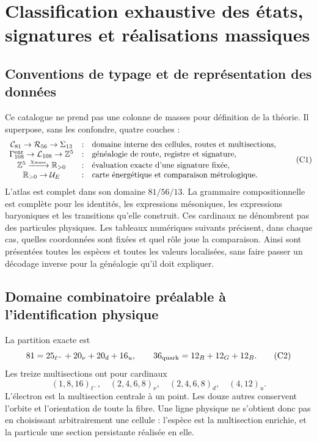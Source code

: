 \chapter{Classification exhaustive des états, signatures et réalisations massiques}
\label{app:catalogo-cientifico-masas-rev6}

\section{Conventions de typage et de représentation des données}

Ce catalogue ne prend pas une colonne de masses pour définition de la théorie.
Il superpose, sans les confondre, quatre couches :
\[
\begin{array}{ccl}
\mathcal C_{81}\to\mathcal R_{56}\to\Sigma_{13}
&:&\text{domaine interne des cellules, routes et multisections},\\
\Gamma_{108}^{\rm enr}\to\mathcal L_{108}\to\mathbb Z^5
&:&\text{généalogie de route, registre et signature},\\
\mathbb Z^5\xrightarrow{\chi_{\rm mass}}\mathbb R_{>0}
&:&\text{évaluation exacte d'une signature fixée},\\
\mathbb R_{>0}\to\mathcal U_E
&:&\text{carte énergétique et comparaison métrologique}.
\end{array}
\tag{C1}\label{eq:cuatro-capas-catalogo-masas}
\]
L'atlas est complet dans son domaine \(81/56/13\). La grammaire compositionnelle
est complète pour les identités, les expressions mésoniques, les expressions
baryoniques et les transitions qu'elle construit. Ces cardinaux ne dénombrent pas
des particules physiques. Les tableaux numériques suivants précisent, dans chaque cas, quelles
coordonnées sont fixées et quel rôle joue la comparaison. Ainsi sont présentées
toutes les espèces et toutes les valeurs localisées, sans faire passer un
décodage inverse pour la généalogie qu'il doit expliquer.

\section{Domaine combinatoire préalable à l'identification physique}

La partition exacte est
\[
81=25_{\ell^-}+20_\nu+20_d+16_u,
\qquad
36_{\rm quark}=12_R+12_G+12_B.
\tag{C2}\label{eq:dominio-catalogo-masas}
\]
Les treize multisections ont pour cardinaux
\[
(1,8,16)_{\ell^-},\quad
(2,4,6,8)_\nu,\quad
(2,4,6,8)_d,\quad
(4,12)_u.
\tag{C3}\label{eq:trece-cardinales-catalogo}
\]
L'électron est la multisection centrale à un point. Les douze autres conservent
l'orbite et l'orientation de toute la fibre. Une ligne physique ne s'obtient donc pas
en choisissant arbitrairement une cellule : l'espèce est la multisection
enrichie, et la particule une section persistante réalisée en elle.

